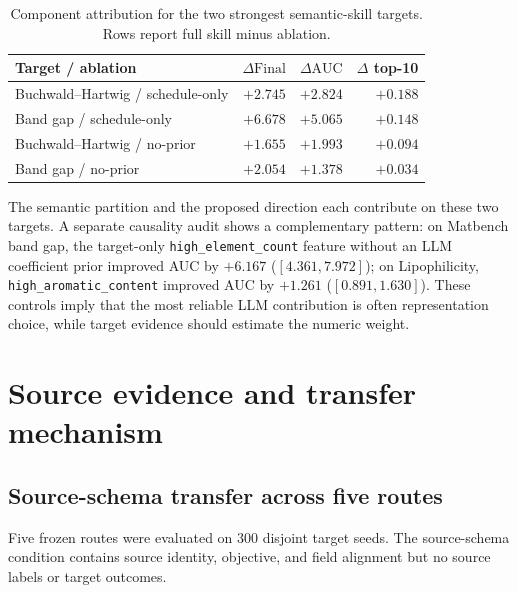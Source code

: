 \documentclass[pdflatex,sn-nature]{sn-jnl}
\newcommand{\dauc}{\Delta\mathrm{AUC}}
\newcommand{\dfinal}{\Delta\mathrm{Final}}
\newcommand{\code}[1]{\texttt{#1}}
\begin{document}
\begin{appendices}
\begin{table}[t]
\centering
\caption{Component attribution for the two strongest semantic-skill targets.
Rows report full skill minus ablation.}
\label{tab:semantic_ablation}
\begin{tabular}{lrrr}
\toprule
Target / ablation & $\dfinal$ & $\dauc$ & $\Delta$ top-10 \\
\midrule
Buchwald--Hartwig / schedule-only & $+2.745$ & $+2.824$ & $+0.188$ \\
Band gap / schedule-only & $+6.678$ & $+5.065$ & $+0.148$ \\
Buchwald--Hartwig / no-prior & $+1.655$ & $+1.993$ & $+0.094$ \\
Band gap / no-prior & $+2.054$ & $+1.378$ & $+0.034$ \\
\bottomrule
\end{tabular}
\end{table}

The semantic partition and the proposed direction each contribute on these two
targets. A separate causality audit shows a complementary pattern: on Matbench
band gap, the target-only \code{high\_element\_count} feature without an LLM
coefficient prior improved AUC by $+6.167$ ($[4.361,7.972]$); on
Lipophilicity, \code{high\_aromatic\_content} improved AUC by $+1.261$
($[0.891,1.630]$). These controls imply that the most reliable LLM contribution
is often representation choice, while target evidence should estimate the
numeric weight.

\section{Source evidence and transfer mechanism}
\label{sec:mechanism}

\subsection{Source-schema transfer across five routes}

Five frozen routes were evaluated on 300 disjoint target seeds. The
source-schema condition contains source identity, objective, and field
alignment but no source labels or target outcomes.


\end{appendices}
\end{document}
